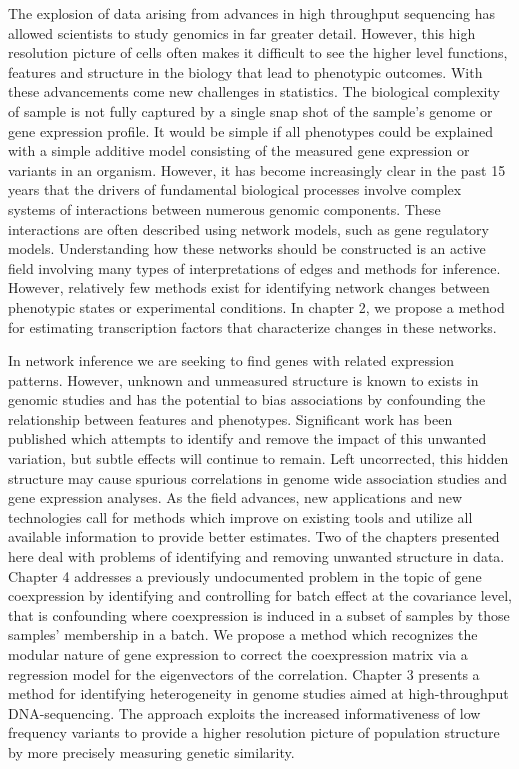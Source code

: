 
The explosion of data arising from advances in high throughput sequencing has allowed scientists to study genomics in far greater detail.  However, this high resolution picture of cells often makes it difficult to see the higher level functions, features and structure in the biology that lead to phenotypic outcomes.  With these advancements come new challenges in statistics. The biological complexity of sample is not fully captured by a single snap shot of the sample's genome or gene expression profile. It would be simple if all phenotypes could be explained with a simple additive model consisting of the measured gene expression or variants in an organism.  However, it has become increasingly clear in the past 15 years that the drivers of fundamental biological processes involve complex systems of interactions between numerous genomic components.  These interactions are often described using network models, such as gene regulatory models.  Understanding how these networks should be constructed is an active field involving many types of interpretations of edges and methods for inference. However, relatively few methods exist for identifying network changes between phenotypic states or experimental conditions.  In chapter 2, we propose a method for estimating transcription factors that characterize changes in these networks.

In network inference we are seeking to find genes with related expression patterns. However, unknown and unmeasured structure is known to exists in genomic studies and has the potential to bias associations by confounding the relationship between features and phenotypes. Significant work has been published which attempts to identify and remove the impact of this unwanted variation, but subtle effects will continue to remain.  Left uncorrected, this hidden structure may cause spurious correlations in genome wide association studies and gene expression analyses. As the field advances, new applications and new technologies call for methods which improve on existing tools and utilize all available information to provide better estimates.  Two of the chapters presented here deal with problems of identifying and removing unwanted structure in data.  Chapter 4 addresses a previously undocumented problem in the topic of gene coexpression by identifying and controlling for batch effect at the covariance level, that is confounding where coexpression is induced in a subset of samples by those samples' membership in a batch.  We propose a method which recognizes the modular nature of gene expression to correct the coexpression matrix via a regression model for the eigenvectors of the correlation.  Chapter 3 presents a method for identifying heterogeneity in genome studies aimed at high-throughput DNA-sequencing. The approach exploits the increased informativeness of low frequency variants to provide a higher resolution picture of population structure by more precisely measuring genetic similarity.
